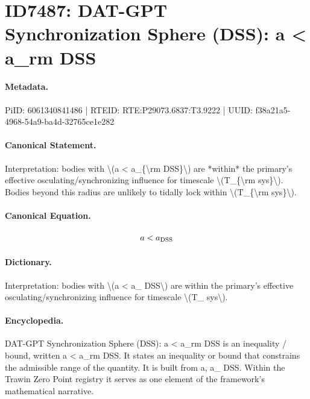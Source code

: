 \section*{ID7487: DAT-GPT Synchronization Sphere (DSS): a < a\_rm DSS}
\paragraph{Metadata.}
PiID: 6061340841486 | RTEID: RTE:P29073.6837:T3.9222 | UUID: f38a21a5-4968-54a9-ba4d-32765ce1e282

\paragraph{Canonical Statement.}
Interpretation: bodies with \textbackslash{}(a < a\_\{\textbackslash{}rm DSS\}\textbackslash{}) are *within* the primary’s effective osculating/synchronizing influence for timescale \textbackslash{}(T\_\{\textbackslash{}rm sys\}\textbackslash{}). Bodies beyond this radius are unlikely to tidally lock within \textbackslash{}(T\_\{\textbackslash{}rm sys\}\textbackslash{}).

\paragraph{Canonical Equation.}
\[
a < a_{\rm DSS}
\]

\paragraph{Dictionary.}
Interpretation: bodies with \textbackslash{}(a < a\_ DSS\textbackslash{}) are within the primary’s effective osculating/synchronizing influence for timescale \textbackslash{}(T\_ sys\textbackslash{}).

\paragraph{Encyclopedia.}
DAT-GPT Synchronization Sphere (DSS): a < a\_rm DSS is an inequality / bound, written a < a\_rm DSS. It states an inequality or bound that constrains the admissible range of the quantity. It is built from a, a\_ DSS. Within the Trawin Zero Point registry it serves as one element of the framework's mathematical narrative.
